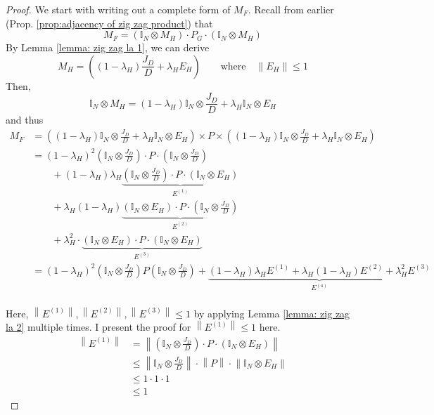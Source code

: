 \documentclass[11pt, letter]{book}
\newcommand{\norm}[1]{\left\lVert#1\right\rVert}
\begin{document}
\begin{proof}
	We start with writing out a complete form of $M_F$. Recall from earlier (Prop. \ref{prop:adjacency of zig zag product}) that 
	\begin{equation}
		M_F = (\mathbb I _N \otimes M_H ) \cdot P_G \cdot ( \mathbb I _ N \otimes M_H )
	\end{equation}
	By Lemma \ref{lemma: zig zag la 1}, we can derive
	\begin{equation}
		M_H = \left( ( 1- \lambda_H ) \frac{J_D}{D} + \lambda_H E_H \right) \quad\quad \text{where} \quad \norm{E_H} \leq 1
	\end{equation}
	Then, 
	\begin{equation}
		\mathbb I _ N \otimes M_H = ( 1- \lambda_H) \mathbb I _N \otimes \frac{J_D}{D} + \lambda_H \mathbb I_N \otimes E_H
	\end{equation}
	and thus
	\begin{align}
		M_F 
		&= \left(
			(1 - \lambda_H) \mathbb I_N \otimes \frac{J_D}{D} + \lambda_H \mathbb I_N \otimes E_H
		\right) \times P \times \left( 
			(1 - \lambda_H) \mathbb I_N \otimes \frac{J_D}{D} + \lambda_H \mathbb I_N \otimes E_H
		\right) \\
		&= ( 1- \lambda_H )^2 \left( \mathbb I _N \otimes \frac{J_D}{D} \right) \cdot P \cdot \left( \mathbb I _N \otimes \frac{J_D}{D} \right) \\
		& \quad \quad + (1 - \lambda_H) \lambda_H \underbrace{\left( \mathbb I _N \otimes \frac{J_D}{D} \right) \cdot P \cdot ( \mathbb I _N \otimes E_H )}_{E^{(1)}} \\
		& \quad \quad + \lambda_H ( 1-\lambda_H) \underbrace{(\mathbb I _N \otimes E_H ) \cdot P \cdot \left( \mathbb I _N \otimes \frac{J_D}{D} \right)}_{E^{(2)}}  \\
		& \quad \quad + \lambda_H^2 \cdot \underbrace{(\mathbb I _N \otimes E_H ) \cdot P \cdot (\mathbb I _N \otimes E_H )} _{E^{(3)}} \\
		&= ( 1- \lambda_H )^2 \left( \mathbb I _N \otimes \frac{J_D}{D} \right) P \left( \mathbb I _N \otimes \frac{J_D}{D} \right) + \underbrace{(1 - \lambda_H)\lambda_H E^{(1)} + \lambda_H(1 - \lambda_H) E^{(2)} + \lambda_H^2 E^{(3)}}_{E^{(4)}} \label{eq:zig zag expanded M_F}\\
	\end{align}
	
	Here, $\norm {E^{(1)}}, \norm {E^{(2)}}, \norm {E^{(3)}} \leq 1$ by applying Lemma \ref{lemma: zig zag la 2} multiple times. I present the proof for $\norm{E^{(1)}} \leq 1$ here.
 	\begin{align}
		\norm{E^{(1)}}
		&= \norm{ \left( \mathbb I _N \otimes \frac{J_D}{D} \right) \cdot P \cdot ( \mathbb I _N \otimes E_H ) } \\
		&\leq \norm{\mathbb I _N \otimes \frac{J_D}{D}} \cdot \norm{P} \cdot \norm{ \mathbb I _N \otimes E_H} \\
		&\leq 1 \cdot 1 \cdot 1 \\
		&\leq 1
	\end{align}
	

\end{proof}
\end{document}
